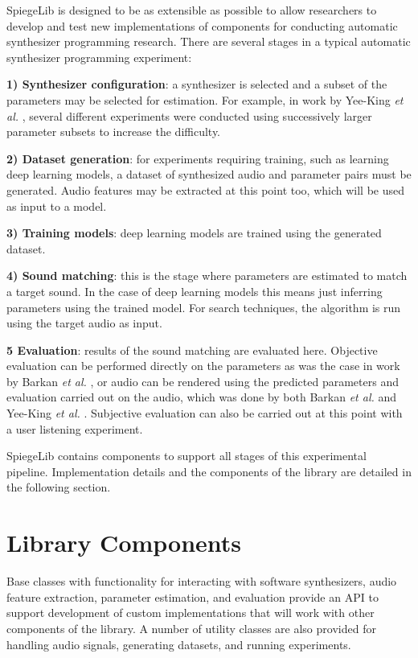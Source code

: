 SpiegeLib is designed to be as extensible as possible to allow researchers to develop and test new implementations of components for conducting automatic synthesizer programming research. There are several stages in a typical automatic synthesizer programming experiment:

\textbf{1) Synthesizer configuration}: a synthesizer is selected and a subset of the parameters may be selected for estimation. For example, in work by Yee-King \textit{et al.} \cite{yee2018automatic}, several different experiments were conducted using successively larger parameter subsets to increase the difficulty.

\textbf{2) Dataset generation}: for experiments requiring training, such as learning deep learning models, a dataset of synthesized audio and parameter pairs must be generated. Audio features may be extracted at this point too, which will be used as input to a model.

\textbf{3) Training models}: deep learning models are trained using the generated dataset.

\textbf{4) Sound matching}: this is the stage where parameters are estimated to match a target sound. In the case of deep learning models this means just inferring parameters using the trained model. For search techniques, the algorithm is run using the target audio as input.

\textbf{5 Evaluation}: results of the sound matching are evaluated here. Objective evaluation can be performed directly on the parameters as was the case in work by Barkan \textit{et al.} \cite{barkan2019inversynth},  or audio can be rendered using the predicted parameters and evaluation carried out on the audio, which was done by both Barkan \textit{et al.} and Yee-King \textit{et al.} \cite{yee2018automatic}. Subjective evaluation can also be carried out at this point with a user listening experiment.

SpiegeLib contains components to support all stages of this experimental pipeline. Implementation details and the components of the library are detailed in the following section.


\section{Library Components}

Base classes with functionality for interacting with software synthesizers, audio feature extraction, parameter estimation, and evaluation provide an API to support development of custom implementations that will work with other components of the library. A number of utility classes are also provided for handling audio signals, generating datasets, and running experiments.

